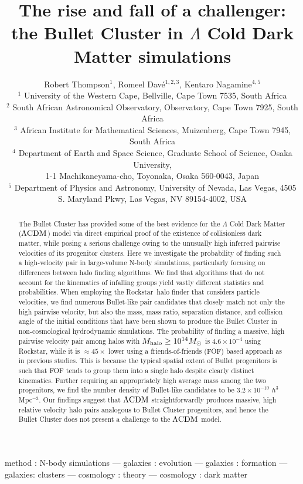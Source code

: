 \documentclass[useAMS, usenatbib]{mn2e}
\title[The Bullet Cluster in $\Lambda$ Cold Dark Matter simulations]{The rise and fall of a challenger: the Bullet Cluster in {\boldmath $\Lambda$} Cold Dark Matter simulations}
\author[Thompson, Dav{\'e}, \& Nagamine]{Robert Thompson$^{1}$,  Romeel Dav{\'e}$^{1,2,3}$, Kentaro Nagamine$^{4,5}$\\%
$^1$ University of the Western Cape, Bellville, Cape Town 7535, South Africa\\
$^2$ South African Astronomical Observatory, Observatory, Cape Town 7925, South Africa\\
$^3$ African Institute for Mathematical Sciences, Muizenberg, Cape Town 7945, South Africa\\
$^4$ Department of Earth and Space Science, Graduate School of Science, Osaka University, \\
1-1 Machikaneyama-cho, Toyonaka, Osaka 560-0043, Japan \\
$^5$ Department of Physics and Astronomy, University of Nevada, Las Vegas, 4505 S. Maryland Pkwy, Las Vegas, NV 89154-4002, USA
}
\newcommand{\lcdm}{\Lambda\rm{CDM}}
\newcommand{\RS}{{\sc Rockstar}}
\begin{document}
\maketitle 


 \begin{abstract}
The Bullet Cluster has provided some of the best evidence for the $\Lambda$ Cold Dark Matter ($\lcdm$) model
via direct empirical proof of the existence of collisionless dark matter, while posing a serious challenge owing 
to the unusually high inferred pairwise velocities of its progenitor
clusters.  Here we investigate the probability of finding such a
high-velocity pair in large-volume N-body simulations, particularly focusing on
differences between halo finding algorithms.  We find that algorithms
that do not account for the kinematics of infalling groups yield
vastly different statistics and probabilities.  When employing the
\RS\ halo finder that considers particle velocities, we find
numerous Bullet-like pair candidates that closely match not only
the high pairwise velocity, 
but also the mass, mass ratio,
separation distance, and collision angle of the initial conditions
that have been shown to produce the Bullet Cluster in non-cosmological
hydrodynamic simulations.  
The probability of finding a massive, high pairwise velocity pair
among halos with $M_{\rm halo}\geq10^{14} M_\odot$ is $4.6\times 10^{-4}$
using \RS, while it is $\approx 45\times$ lower using a
friends-of-friends (FOF) based approach as in previous studies.
This is because the typical spatial extent of Bullet progenitors is
such that FOF tends to group them
into a single halo despite clearly distinct kinematics.
Further requiring an appropriately high average mass among the two
progenitors, we find the number density of Bullet-like candidates to
be $3.2\times 10^{-10}$ $h^3$Mpc$^{-3}$.
Our findings suggest that $\lcdm$ straightforwardly produces massive,
high relative velocity halo pairs analogous to Bullet Cluster
progenitors, and hence the Bullet Cluster does not present a challenge
to the $\lcdm$ model.

\end{abstract}


\begin{keywords}
method : N-body simulations --- galaxies : evolution --- galaxies : formation --- galaxies: clusters --- cosmology : theory --- cosmology : dark matter
\end{keywords}
\end{document}
